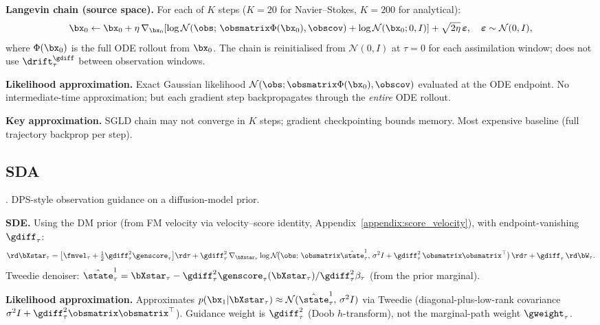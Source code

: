 \textbf{Langevin chain (source space).}
For each of $K$ steps ($K=20$ for Navier--Stokes, $K=200$ for analytical):
\begin{align}
  \bx_0 \leftarrow \bx_0
  + \eta\,\nabla_{\bx_0}\!\left[\log\mathcal{N}(\obs;\,\obsmatrix\Phi(\bx_0),\obscov)
    + \log\mathcal{N}(\bx_0;0,I)\right]
  + \sqrt{2\eta}\,\boldsymbol\varepsilon,
  \quad \boldsymbol\varepsilon\sim\mathcal{N}(0,I),
\end{align}
where $\Phi(\bx_0)$ is the full ODE rollout from $\bx_0$. The chain is reinitialised from $\mathcal{N}(0,I)$ at $\tau=0$ for each assimilation window; does not use $\drift^{\gdiff}_\tau$ between observation windows.

\textbf{Likelihood approximation.}
Exact Gaussian likelihood $\mathcal{N}(\obs;\obsmatrix\Phi(\bx_0),\obscov)$ evaluated at the ODE endpoint.
No intermediate-time approximation; but each gradient step backpropagates through the \emph{entire} ODE rollout.

\textbf{Key approximation.}
SGLD chain may not converge in $K$ steps; gradient checkpointing bounds memory. Most expensive baseline (full trajectory backprop per step).

\subsection{SDA}\label{appendix:method:sda}

\cite{rozet_score-based_2023}. DPS-style observation guidance on a diffusion-model prior.

\textbf{SDE.}
Using the DM prior (from FM velocity via velocity--score identity, Appendix~\ref{appendix:score_velocity}),
with endpoint-vanishing $\gdiff_\tau$:
\begin{align}
  \rd\bXstar_\tau
  = \bigl[\fmvel_\tau + \tfrac12\gdiff_\tau^2\genscore_\tau\bigr]\rd\tau
  + \gdiff_\tau^2\,\nabla_{\bXstar_\tau}\log\mathcal{N}\!\bigl(\obs;\,\obsmatrix\hat{\state}^1_\tau,\,
    \sigma^2 I + \gdiff_\tau^2\,\obsmatrix\obsmatrix^\top\bigr)\,\rd\tau
  + \gdiff_\tau\,\rd\bW_\tau.
\end{align}
Tweedie denoiser: $\hat{\state}^1_\tau = \bXstar_\tau - \gdiff_\tau^2\genscore_\tau(\bXstar_\tau)/\gdiff_\tau^2\beta_\tau$ (from the prior marginal).

\textbf{Likelihood approximation.}
Approximates $p(\bx_1|\bXstar_\tau)\approx\mathcal{N}(\hat{\state}^1_\tau,\,\sigma^2 I)$ via Tweedie (diagonal-plus-low-rank covariance $\sigma^2 I + \gdiff_\tau^2\obsmatrix\obsmatrix^\top$). Guidance weight is $\gdiff_\tau^2$ (Doob $h$-transform), not the marginal-path weight $\gweight_\tau$.

